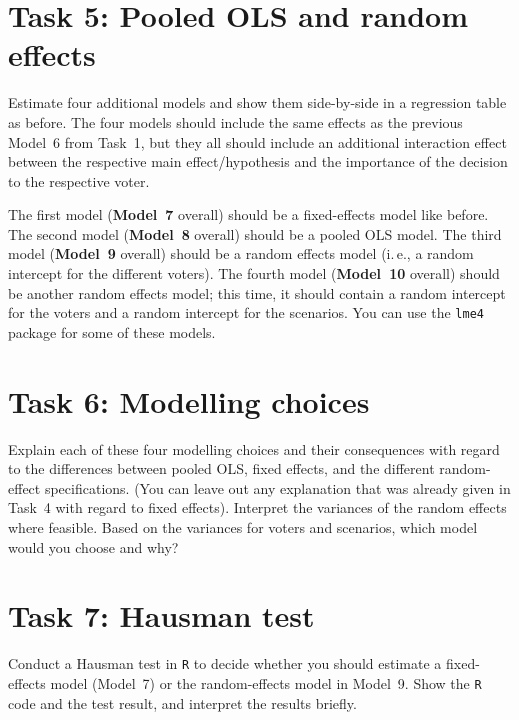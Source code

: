 \documentclass[a4paper,11pt]{article}
\begin{document}
\section*{Task 5: Pooled OLS and random effects}
Estimate four additional models and show them side-by-side in a regression table as before. The four models should include the same effects as the previous Model~6 from Task~1, but they all should include an additional interaction effect between the respective main effect/hypothesis and the importance of the decision to the respective voter.

The first model (\textbf{Model~7} overall) should be a fixed-effects model like before. The second model (\textbf{Model~8} overall) should be a pooled OLS model. The third model (\textbf{Model~9} overall) should be a random effects model (i.\,e., a random intercept for the different voters). The fourth model (\textbf{Model~10} overall) should be another random effects model; this time, it should contain a random intercept for the voters and a random intercept for the scenarios. You can use the \texttt{lme4} package for some of these models.

\section*{Task 6: Modelling choices}
Explain each of these four modelling choices and their consequences with regard to the differences between pooled OLS, fixed effects, and the different random-effect specifications. (You can leave out any explanation that was already given in Task~4 with regard to fixed effects). Interpret the variances of the random effects where feasible. Based on the variances for voters and scenarios, which model would you choose and why?

\section*{Task 7: Hausman test}
Conduct a Hausman test in \texttt{R} to decide whether you should estimate a fixed-effects model (Model~7) or the random-effects model in Model~9. Show the \texttt{R} code and the test result, and interpret the results briefly.
\end{document}
